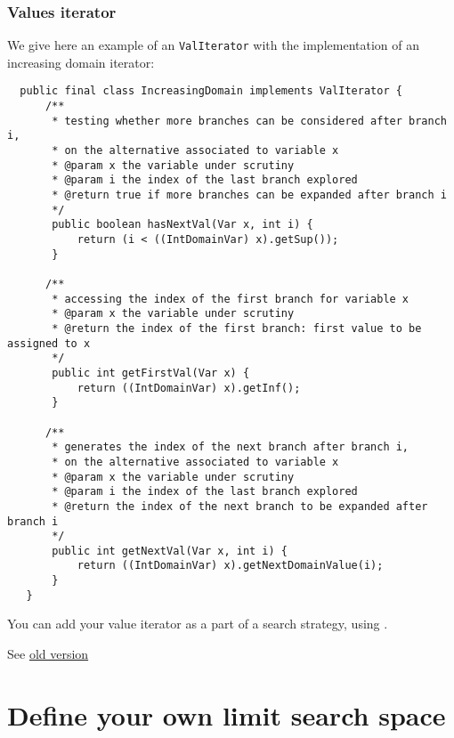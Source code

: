 \subsubsection{Values iterator}\label{advanced:valuesiterator}\hypertarget{advanced:valuesiterator}{}
We give here an example of an \texttt{ValIterator} with the implementation of an increasing domain iterator:
\begin{lstlisting}
  public final class IncreasingDomain implements ValIterator {
	  /**
	   * testing whether more branches can be considered after branch i, 
       * on the alternative associated to variable x
	   * @param x the variable under scrutiny
	   * @param i the index of the last branch explored
	   * @return true if more branches can be expanded after branch i
	   */
       public boolean hasNextVal(Var x, int i) {
           return (i < ((IntDomainVar) x).getSup());
       }
	
	  /**
	   * accessing the index of the first branch for variable x
	   * @param x the variable under scrutiny
	   * @return the index of the first branch: first value to be assigned to x
	   */
       public int getFirstVal(Var x) {
           return ((IntDomainVar) x).getInf();
       }
	
	  /**
	   * generates the index of the next branch after branch i, 
       * on the alternative associated to variable x
	   * @param x the variable under scrutiny
	   * @param i the index of the last branch explored
	   * @return the index of the next branch to be expanded after branch i
	   */
       public int getNextVal(Var x, int i) {
           return ((IntDomainVar) x).getNextDomainValue(i);
       }
   }
\end{lstlisting}

You can add your value iterator as a part of a search strategy, using .

 See \href{http://choco-solver.net/index.phptitle=userguide:beyondvariable.2fvalueselection.2chowtodefineyourownbranchingobject}{old version}

\section{Define your own limit search space}\label{advanced:defineyourownlimitsearchspace}\hypertarget{advanced:defineyourownlimitsearchspace}{}

